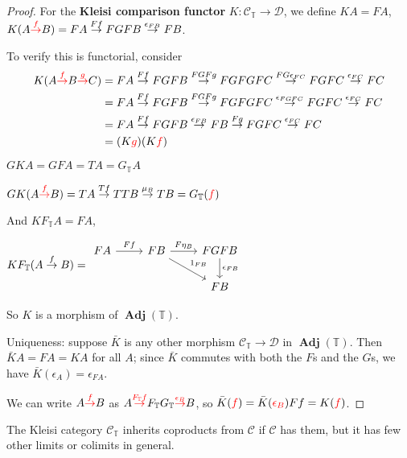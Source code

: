 \documentclass[a4paper]{article}
\theoremstyle{definition}
\theoremstyle{remark}
\theoremstyle{default}
\numberwithin{definition}{section}
\DeclareMathOperator{\Adj}{\textbf{Adj}}
\begin{document}
\begin{proof}
	For the \textbf{Kleisi comparison functor} $K: \mathcal{C}_\mathbb{T} \to \mathcal{D}$,
	we define $KA=FA$,
	$K(A \textcolor{red}{\overset{f}{\to}} B) = FA \overset{Ff}{\to} FGFB \overset{\epsilon_{FB}}{\to} FB$.
	
	To verify this is functorial, consider
	\begin{align*}
		K(A \textcolor{red}{\overset{f}{\to}} B \textcolor{red}{\overset{g}{\to}} C) &=
			FA \overset{Ff}{\to} FGFB \overset{FGFg}{\to} FGFGFC \overset{FG\epsilon_{FC}}{\to} FGFC \overset{\epsilon_{FC}}{\to} FC \\
			&= FA \overset{Ff}{\to} FGFB \overset{FGFg}{\to} FGFGFC \overset{\epsilon_{FGFC}}{\to} FGFC \overset{\epsilon_{FC}}{\to} FC \\
			&= FA \overset{Ff}{\to} FGFB \overset{\epsilon_{FB}}{\to} FB \overset{Fg}{\to} FGFC \overset{\epsilon_{FC}}{\to} FC \\
			&= (K\textcolor{red}{g})(K\textcolor{red}{f})
	\end{align*}
	
	$GKA = GFA = TA = G_\mathbb{T}A$
	
	$GK(A \textcolor{red}{\overset{f}{\to}} B) = TA \overset{Tf}{\to} TTB \overset{\mu_B}{\to} TB = G_\mathbb{T}(\textcolor{red}{f})$
	
	And $KF_\mathbb{T}A = FA$,
	
	$KF_\mathbb{T}(A \overset{f}{\to} B) = \begin{tikzcd} FA \ar{r}{Ff} & FB \ar{r}{F\eta_B} \ar{rd}{1_{FB}} & FGFB \ar{d}{\epsilon_{FB}} \\ && FB\end{tikzcd}$
	
	So $K$ is a morphism of $\Adj(\mathbb{T})$.
	
	Uniqueness: suppose $\bar{K}$ is any other morphism $\mathcal{C}_\mathbb{T} \to \mathcal{D}$ in $\Adj(\mathbb{T})$.
	Then $\bar{K}A = FA = KA$ for all $A$;
	since $\bar{K}$ commutes with both the $F$s and the $G$s,
	we have $\bar{K}(\epsilon_A) = \epsilon_{FA}$.
	
	We can write $A \textcolor{red}{\overset{f}{\to}} B$ as
	$A \textcolor{red}{\overset{F_\mathbb{T}f}{\to}} F_\mathbb{T}G_\mathbb{T} \textcolor{red}{\overset{\epsilon_B}{\to}} B$,
	so $\bar{K}(\textcolor{red}{f}) = \bar{K}(\textcolor{red}{\epsilon_B})Ff=K(\textcolor{red}{f})$.
\end{proof}

The Kleisi category $\mathcal{C}_\mathbb{T}$ inherits coproducts from $\mathcal{C}$ if $\mathcal{C}$ has them,
but it has few other limits or colimits in general.
\end{document}
